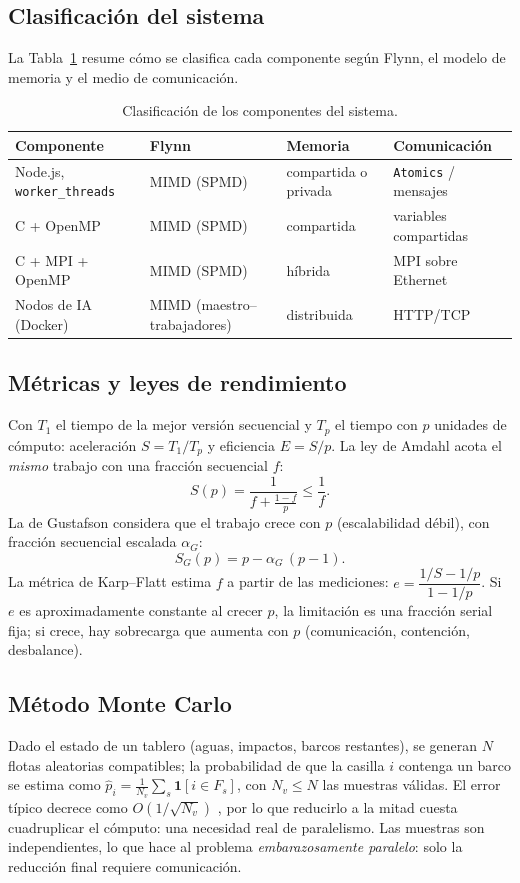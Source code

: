 \documentclass[conference]{IEEEtran}
\begin{document}
\subsection{Clasificaci\'on del sistema}
La Tabla~\ref{tab:clasif} resume c\'omo se clasifica cada componente seg\'un Flynn, el modelo de memoria y el medio de comunicaci\'on.
\begin{table}[t]
\caption{Clasificaci\'on de los componentes del sistema.}\label{tab:clasif}
\centering\scriptsize
\begin{tabular}{@{}llll@{}}
\toprule
Componente & Flynn & Memoria & Comunicaci\'on\\\midrule
Node.js, \texttt{worker\_threads} & MIMD (SPMD) & compartida o privada & \texttt{Atomics} / mensajes\\
C + OpenMP & MIMD (SPMD) & compartida & variables compartidas\\
C + MPI + OpenMP & MIMD (SPMD) & h\'ibrida & MPI sobre Ethernet\\
Nodos de IA (Docker) & MIMD (maestro--trabajadores) & distribuida & HTTP/TCP\\\bottomrule
\end{tabular}
\end{table}

\subsection{M\'etricas y leyes de rendimiento}
Con $T_1$ el tiempo de la mejor versi\'on secuencial y $T_p$ el tiempo con $p$ unidades de c\'omputo: aceleraci\'on $S=T_1/T_p$ y eficiencia $E=S/p$. La ley de Amdahl \cite{amdahl1967} acota el \emph{mismo} trabajo con una fracci\'on secuencial $f$:
\begin{equation}\label{eq:amdahl}
S(p)=\frac{1}{f+\frac{1-f}{p}}\le\frac{1}{f}.
\end{equation}
La de Gustafson \cite{gustafson1988} considera que el trabajo crece con $p$ (escalabilidad d\'ebil), con fracci\'on secuencial escalada $\alpha_G$:
\begin{equation}\label{eq:gustafson}
S_G(p)=p-\alpha_G\,(p-1).
\end{equation}
La m\'etrica de Karp--Flatt \cite{karpflatt1990} estima $f$ a partir de las mediciones: $e=\dfrac{1/S-1/p}{1-1/p}$. Si $e$ es aproximadamente constante al crecer $p$, la limitaci\'on es una fracci\'on serial fija; si crece, hay sobrecarga que aumenta con $p$ (comunicaci\'on, contenci\'on, desbalance).

\subsection{M\'etodo Monte Carlo}
Dado el estado de un tablero (aguas, impactos, barcos restantes), se generan $N$ flotas aleatorias compatibles; la probabilidad de que la casilla $i$ contenga un barco se estima como $\hat p_i=\frac{1}{N_v}\sum_{s}\mathbf 1[i\in F_s]$, con $N_v\le N$ las muestras v\'alidas. El error t\'ipico decrece como $O(1/\sqrt{N_v})$ \cite{metropolis1949}, por lo que reducirlo a la mitad cuesta cuadruplicar el c\'omputo: una necesidad real de paralelismo. Las muestras son independientes, lo que hace al problema \emph{embarazosamente paralelo}: solo la reducci\'on final requiere comunicaci\'on.
\end{document}
